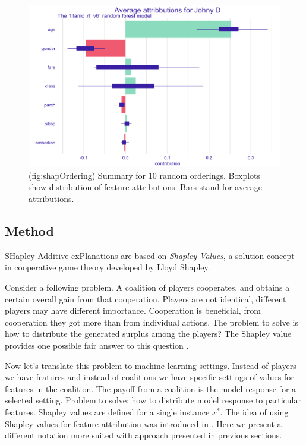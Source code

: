 \documentclass[12pt,]{krantz}
\theoremstyle{definition}
\theoremstyle{definition}
\theoremstyle{definition}
\theoremstyle{remark}
\begin{document}
\begin{figure}

{\centering \includegraphics[width=0.7\linewidth]{figure/shap_ordering} 

}

\caption{(fig:shapOrdering) Summary for 10 random orderings. Boxplots show distribution of feature attributions. Bars stand for average attributions.}\label{fig:shapOrdering}
\end{figure}

\hypertarget{method-2}{%
\subsection{Method}\label{method-2}}

SHapley Additive exPlanations are based on \emph{Shapley Values}, a
solution concept in cooperative game theory developed by Lloyd Shapley.

Consider a following problem. A coalition of players cooperates, and
obtains a certain overall gain from that cooperation. Players are not
identical, different players may have different importance. Cooperation
is beneficial, from cooperation they got more than from individual
actions. The problem to solve is how to distribute the generated surplus
among the players? The Shapley value provides one possible fair answer
to this question \citep{shapleybook1952}.

Now let's translate this problem to machine learning settings. Instead
of players we have features and instead of coalitions we have specific
settings of values for features in the coalition. The payoff from a
coalition is the model response for a selected setting. Problem to
solve: how to distribute model response to particular features. Shapley
values are defined for a single instance \(x^*\). The idea of using
Shapley values for feature attribution was introduced in
\citep{imeJLMR}. Here we present a different notation more suited with
approach presented in previous sections.
\end{document}
